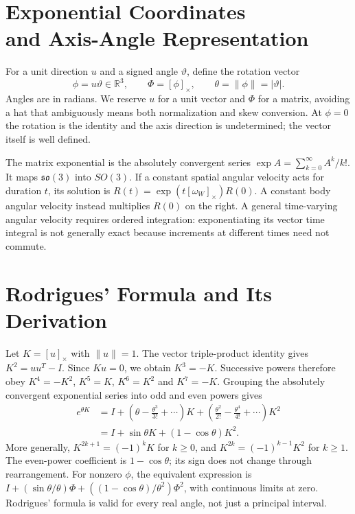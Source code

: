 \section[Exponential Coordinates and Axis-Angle Representation]{Exponential Coordinates\\and Axis-Angle Representation}
\label{sec:exponential_coordinates}

For a unit direction $u$ and a signed angle $\vartheta$, define the rotation vector
\begin{equation}
 \phi=u\vartheta\in\mathbb R^3,\qquad
 \Phi=[\phi]_\times,\qquad \theta=\|\phi\|=|\vartheta|.
 \label{eq:exp_coord}
\end{equation}
Angles are in radians. We reserve $u$ for a unit vector and $\Phi$ for a matrix, avoiding a hat that ambiguously means both normalization and skew conversion. At $\phi=0$ the rotation is the identity and the axis direction is undetermined; the vector itself is well defined.

The matrix exponential is the absolutely convergent series $\exp A=\sum_{k=0}^\infty A^k/k!$. It maps $\mathfrak{so}(3)$ into $SO(3)$. If a constant spatial angular velocity acts for duration $t$, its solution is $R(t)=\exp(t[\omega_W]_\times)R(0)$. A constant body angular velocity instead multiplies $R(0)$ on the right. A general time-varying angular velocity requires ordered integration: exponentiating its vector time integral is not generally exact because increments at different times need not commute.

\section{Rodrigues' Formula and Its Derivation}
\label{sec:rodrigues_formula}

Let $K=[u]_\times$ with $\|u\|=1$. The vector triple-product identity gives $K^2=uu^T-I$. Since $Ku=0$, we obtain $K^3=-K$. Successive powers therefore obey $K^4=-K^2$, $K^5=K$, $K^6=K^2$ and $K^7=-K$. Grouping the absolutely convergent exponential series into odd and even powers gives
\begin{equation}
 \begin{aligned}
 e^{\theta K}
 &=I+\left(\theta-\frac{\theta^3}{3!}+\cdots\right)K
   +\left(\frac{\theta^2}{2!}-\frac{\theta^4}{4!}+\cdots\right)K^2\\
 &=I+\sin\theta K+(1-\cos\theta)K^2.
 \end{aligned}
 \label{eq:rodrigues}
\end{equation}
More generally, $K^{2k+1}=(-1)^kK$ for $k\geq0$, and $K^{2k}=(-1)^{k-1}K^2$ for $k\geq1$. The even-power coefficient is $1-\cos\theta$; its sign does not change through rearrangement. For nonzero $\phi$, the equivalent expression is $I+(\sin\theta/\theta)\Phi+((1-\cos\theta)/\theta^2)\Phi^2$, with continuous limits at zero. Rodrigues' formula is valid for every real angle, not just a principal interval.

